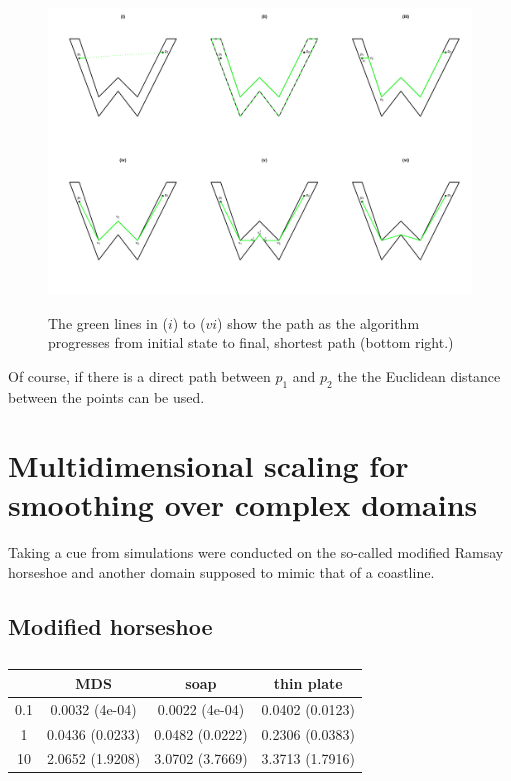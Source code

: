 \documentclass[a4paper,10pt]{article}
\begin{document}
\begin{figure}
\centering
\includegraphics[trim=0in 0.5in 0in 0.25in, width=7in]{figs/wdia.pdf} \\
\caption{The green lines in ($i$) to ($vi$) show the path as the algorithm progresses from initial state to final, shortest path (bottom right.) }
\label{wdia}
\end{figure}

Of course, if there is a direct path between $p_1$ and $p_2$ the the Euclidean distance between the points can be used.

\section{Multidimensional scaling for smoothing over complex domains}

Taking a cue from \cite{soap} simulations were conducted on the so-called modified Ramsay horseshoe and another domain supposed to mimic that of a coastline.

\subsection{Modified horseshoe}

\begin{table}[ht]
\begin{tabular}{c || c c c}\\
 & MDS & soap & thin plate\\ 
\hline
\hline
0.1  & 0.0032 (4e-04) & 0.0022 (4e-04) & 0.0402 (0.0123)\\ 
1  & 0.0436 (0.0233) & 0.0482 (0.0222) & 0.2306 (0.0383)\\ 
10  & 2.0652 (1.9208) & 3.0702 (3.7669) & 3.3713 (1.7916)\\ 
\end{tabular}
\label{ramsayresultstable}
\caption{}
\end{table}
\end{document}
